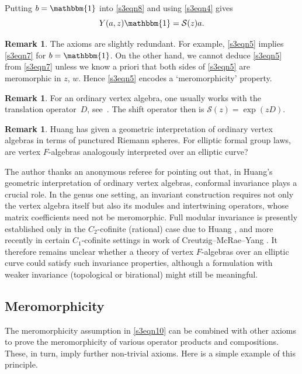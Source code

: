 \documentclass[10pt,a4paper]{amsart}
\numberwithin{equation}{section}
\theoremstyle{definition}
\newtheorem{Remark}[Theorem]{Remark}
\begin{document}
Putting $b=\mathbbm{1}$ into \eqref{s3eqn8} and using \eqref{s3eqn4} gives
\begin{equation}
\label{s3YD}
 Y(a,z)\mathbbm{1}=\mathcal{S}(z)a.
\end{equation}

\begin{Remark}
The axioms are slightly redundant. For example, \eqref{s3eqn5} implies \eqref{s3eqn7} for $b=\mathbbm{1}$. On the other hand, we cannot deduce \eqref{s3eqn5} from \eqref{s3eqn7} unless we know a priori that both sides of \eqref{s3eqn5} are meromorphic in $z$, $w$. Hence \eqref{s3eqn5} encodes a `meromorphicity' property.
\end{Remark}

\begin{Remark}
For an ordinary vertex algebra, one usually works with the translation operator~$D$, see~\cite{LL}. The shift operator then is $\mathcal{S}(z)=\exp(zD)$.
\end{Remark}

\begin{Remark}\label{ConjecturalRemark}
Huang \cite{Huang} has given a geometric interpretation of ordinary vertex algebras in terms of punctured Riemann spheres. For elliptic formal group laws, are vertex $F$-algebras analogously interpreted over an elliptic curve?

The author thanks an anonymous referee for pointing out that, in Huang's geometric interpretation of ordinary vertex algebras, conformal invariance plays a crucial role. In the genus one setting, an invariant construction requires not only the vertex algebra itself but also its modules and intertwining operators, whose matrix coefficients need not be meromorphic. Full modular invariance is presently established only in the $C_2$-cofinite (rational) case due to Huang \cite{HuangModular}, and more recently in certain $C_1$-cofinite settings in work of Creutzig--McRae--Yang \cite{CMY}. It therefore remains unclear whether a theory of vertex $F$-algebras over an elliptic curve could satisfy such invariance properties, although a formulation with weaker invariance (topological or birational) might still be meaningful.
\end{Remark}

\subsection{Meromorphicity}
\label{s42}

The meromorphicity assumption in \eqref{s3eqn10} can be combined with other axioms to prove the meromorphicity of various operator products and compositions. These, in turn, imply further non-trivial axioms. Here is a simple example of this principle.
\end{document}
